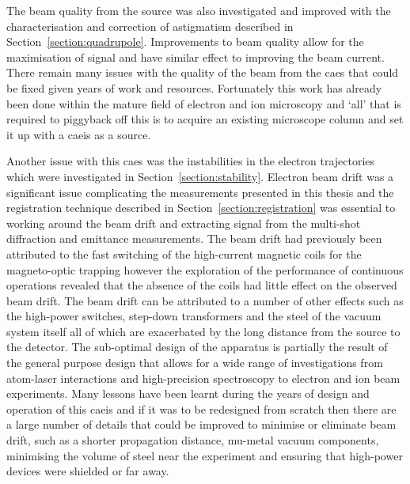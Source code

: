 The beam quality from the source was also investigated and improved with the characterisation and correction of astigmatism described in Section~\ref{section:quadrupole}.
Improvements to beam quality allow for the maximisation of signal and have similar effect to improving the beam current.
There remain many issues with the quality of the beam from the \gls{caes} that could be fixed given years of work and resources.
Fortunately this work has already been done within the mature field of electron and ion microscopy and `all' that is required to piggyback off this is to acquire an existing microscope column and set it up with a \gls{caeis} as a source.

Another issue with this \gls{caes} was the instabilities in the electron trajectories which were investigated in Section~\ref{section:stability}.
Electron beam drift was a significant issue complicating the measurements presented in this thesis and the registration technique described in Section~\ref{section:registration} was essential to working around the beam drift and extracting signal from the multi-shot diffraction and emittance measurements.
The beam drift had previously been attributed to the fast switching of the high-current magnetic coils for the magneto-optic trapping however the exploration of the performance of continuous operations revealed that the absence of the coils had little effect on the observed beam drift.
The beam drift can be attributed to a number of other effects such as the high-power switches, step-down transformers and the steel of the vacuum system itself all of which are exacerbated by the long distance from the source to the detector.
The sub-optimal design of the apparatus is partially the result of the general purpose design that allows for a wide range of investigations from atom-laser interactions and high-precision spectroscopy to electron and ion beam experiments.
Many lessons have been learnt during the years of design and operation of this \gls{caeis} and if it was to be redesigned from scratch then there are a large number of details that could be improved to minimise or eliminate beam drift, such as a shorter propagation distance, mu-metal vacuum components, minimising the volume of steel near the experiment and ensuring that high-power devices were shielded or far away.

